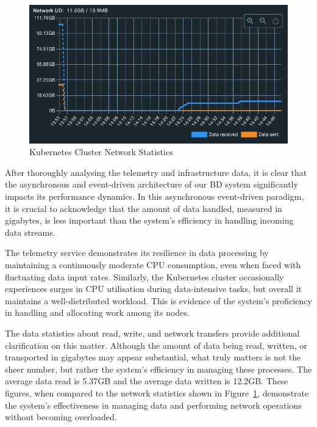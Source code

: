 \documentclass[journal]{IEEEtran}
\begin{document}
\begin{figure}
  \centering
  \includegraphics[width=\columnwidth]{images/kubernetes-cluster-network-data-received-and-sent.png}
  \caption{Kubernetes Cluster Network Statistics}
  \label{kubernetesClusterNetworkStatistics}
\end{figure}

After thoroughly analysing the telemetry and infrastructure data, it is clear that the asynchronous and event-driven architecture of our BD system significantly impacts its performance dynamics. In this asynchronous event-driven paradigm, it is crucial to acknowledge that the amount of data handled, measured in gigabytes, is less important than the system's efficiency in handling incoming data streams.

The telemetry service demonstrates its resilience in data processing by maintaining a continuously moderate CPU consumption, even when faced with fluctuating data input rates. Similarly, the Kubernetes cluster occasionally experiences surges in CPU utilisation during data-intensive tasks, but overall it maintains a well-distributed workload. This is evidence of the system's proficiency in handling and allocating work among its nodes.

The data statistics about read, write, and network transfers provide additional clarification on this matter. Although the amount of data being read, written, or transported in gigabytes may appear substantial, what truly matters is not the sheer number, but rather the system's efficiency in managing these processes. The average data read is 5.37GB and the average data written is 12.2GB. These figures, when compared to the network statistics shown in Figure~\ref{kubernetesClusterNetworkStatistics}, demonstrate the system's effectiveness in managing data and performing network operations without becoming overloaded.
\end{document}
